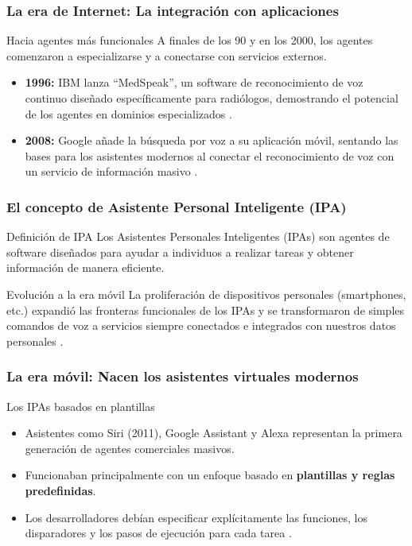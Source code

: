 \documentclass[handout]{beamer}
\begin{document}
\begin{frame}
    \frametitle{La era de Internet: La integración con aplicaciones}
    \begin{block}{Hacia agentes más funcionales}
    A finales de los 90 y en los 2000, los agentes comenzaron a especializarse y a conectarse con servicios externos.
     \begin{itemize}
         \item \textbf{1996:} IBM lanza ``MedSpeak'', un software de reconocimiento de voz continuo diseñado específicamente para radiólogos, demostrando el potencial de los agentes en dominios especializados \parencite{li2024personalllmagentsinsights}.
         \medskip
         \item \textbf{2008:} Google añade la búsqueda por voz a su aplicación móvil, sentando las bases para los asistentes modernos al conectar el reconocimiento de voz con un servicio de información masivo \parencite{li2024personalllmagentsinsights}.
     \end{itemize}
    \end{block}
\end{frame}

\begin{frame}
    \frametitle{El concepto de Asistente Personal Inteligente (IPA)}
    \begin{block}{Definición de IPA}
    Los Asistentes Personales Inteligentes (IPAs) son agentes de software diseñados para ayudar a individuos a realizar tareas y obtener información de manera eficiente.
    \end{block}
    \begin{exampleblock}{Evolución a la era móvil}
     La proliferación de dispositivos personales (smartphones, etc.) expandió  las fronteras funcionales de los IPAs y se transformaron de simples comandos de voz a servicios siempre conectados e integrados con nuestros datos personales \parencite{li2024personalllmagentsinsights}.
    \end{exampleblock}
\end{frame}

\begin{frame}
  \frametitle{La era móvil: Nacen los asistentes virtuales modernos}
  \begin{exampleblock}{Los IPAs basados en plantillas}
    \begin{itemize}
        \item Asistentes como Siri (2011), Google Assistant y Alexa representan la primera generación de agentes comerciales masivos.
        \item Funcionaban principalmente con un enfoque basado en \textbf{plantillas y reglas predefinidas}.
        \item Los desarrolladores debían especificar explícitamente las funciones, los disparadores y los pasos de ejecución para cada tarea \parencite{li2024personalllmagentsinsights}.
    \end{itemize}
  \end{exampleblock}
\end{frame}
\end{document}
